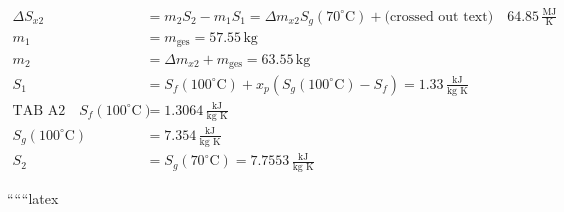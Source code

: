 \begin{align*}
    \Delta S_{x2} &= m_2 S_2 - m_1 S_1 = \Delta m_{x2} S_g(70^\circ \text{C}) + \text{(crossed out text)} \quad 64.85 \, \frac{\text{MJ}}{\text{K}} \\
    m_1 &= m_{\text{ges}} = 57.55 \, \text{kg} \\
    m_2 &= \Delta m_{x2} + m_{\text{ges}} = 63.55 \, \text{kg} \\
    S_1 &= S_f(100^\circ \text{C}) + x_p (S_g(100^\circ \text{C}) - S_f) = 1.33 \, \frac{\text{kJ}}{\text{kg K}} \\
    \text{TAB A2} \quad S_f(100^\circ \text{C}) &= 1.3064 \, \frac{\text{kJ}}{\text{kg K}} \\
    S_g(100^\circ \text{C}) &= 7.354 \, \frac{\text{kJ}}{\text{kg K}} \\
    S_2 &= S_g(70^\circ \text{C}) = 7.7553 \, \frac{\text{kJ}}{\text{kg K}}
\end{align*}

``````latex


